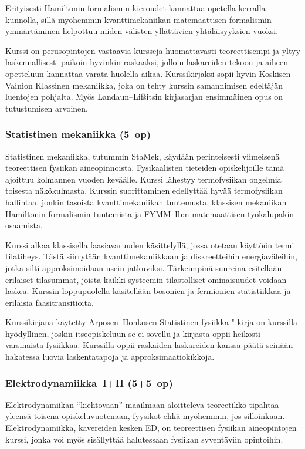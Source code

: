 \documentclass[../ala_hataile.tex]{subfiles}
\begin{document}
	Erityisesti Hamiltonin formalismin kieroudet
	kannattaa opetella kerralla kunnolla,
	sillä myöhemmin kvantti\-mekaniikan matemaattisen
	formalismin ymmärtäminen
	helpottuu niiden välisten yllättävien yhtäläisyyksien
	vuoksi.
	
	Kurssi on perus\-opintojen vastaavia kursseja
	huomattavasti teoreettisempi ja yltyy
	laskennallisesti paikoin hyvinkin raskaaksi,
	jolloin laskareiden tekoon ja aiheen opetteluun
	kannattaa varata huolella aikaa. Kurssikirjaksi
	sopii hyvin Koskisen--Vainion
	Klassinen mekaniikka, joka on tehty kurssin
	samannimisen edeltäjän luentojen pohjalta.
	Myös Landaun--Lifšitsin kirjasarjan ensimmäinen opus on tutustumisen arvoinen.
	
	\subsubsection*{Statistinen mekaniikka (5~op)}
	Statistinen mekaniikka, tutummin StaMek,
	käydään perinteisesti viimeisenä teoreettisen
	fysiikan aine\-opinnoista. Fysikaalisten tieteiden opiskelijoille
	tämä ajoittuu kolmannen vuoden
	keväälle. Kurssi lähestyy termo\-fysiikan ongelmia
	toisesta näkökulmasta. Kurssin suorittaminen
	edellyttää hyvää termo\-fysiikan hallintaa,
	jonkin tasoista kvantti\-mekaniikan tuntemusta,
	klassisen mekaniikan Hamiltonin
	formalismin tuntemista ja FYMM~Ib:n matemaattisen
	työ\-kalu\-pakin osaamista.
	
	Kurssi alkaa klassisella faasi\-avaruuden
	käsittelyllä, jossa otetaan käyttöön termi
	tila\-tiheys. Tästä siirrytään kvantti\-mekaniikkaan
	ja diskreetteihin energia\-väleihin,
	jotka silti approksimoidaan usein jatkuviksi.
	Tärkeimpinä suureina esitellään erilaiset
	tila\-summat, joista kaikki systeemin tilastolliset
	ominaisuudet voidaan laskea.
	Kurssin loppupuolella käsitellään bosonien
	ja fermionien statistiikkaa ja erilaisia
	faasi\-transitioita.
	
	Kurssikirjana käytetty Arposen--Honkosen
	Statistinen fysiikka "-kirja on kurssilla
	hyödyllinen, joskin itse\-opiskeluun se ei
	sovellu ja kirjasta oppii heikosti varsinaista
	fysiikkaa. Kurssilla oppii raskaiden laskareiden
	kanssa päätä seinään hakatessa luovia
	laskenta\-tapoja ja approksimaatio\-kikkoja.
	
	\subsubsection*{Elektrodynamiikka~I+II (5+5~op)}
	Elektrodynamiikan ``kiehtovaan'' maailmaan
	aloitteleva teoreetikko tipahtaa
	yleensä toisena opiskelu\-vuotenaan, fyysikot
	ehkä myöhemmin, jos silloinkaan.
	Elektro\-dynamiikka, kavereiden kesken
	ED, on teoreettisen fysiikan aine\-opintojen
	kurssi, jonka voi myös sisällyttää halutessaan
	fysiikan syventäviin opintoihin.
	
\end{document}
